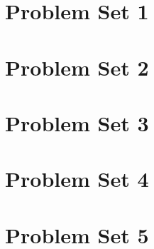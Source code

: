 \section{Problem Set 1}

\begin{problem}{}
\end{problem}
\begin{solution}
\end{solution}

\section{Problem Set 2}

\begin{problem}{}
\end{problem}
\begin{solution}
\end{solution}

\section{Problem Set 3}

\begin{problem}{}
\end{problem}
\begin{solution}
\end{solution}

\section{Problem Set 4}

\begin{problem}{}
\end{problem}
\begin{solution}
\end{solution}

\section{Problem Set 5}

\begin{problem}{}
\end{problem}
\begin{solution}
\end{solution}
